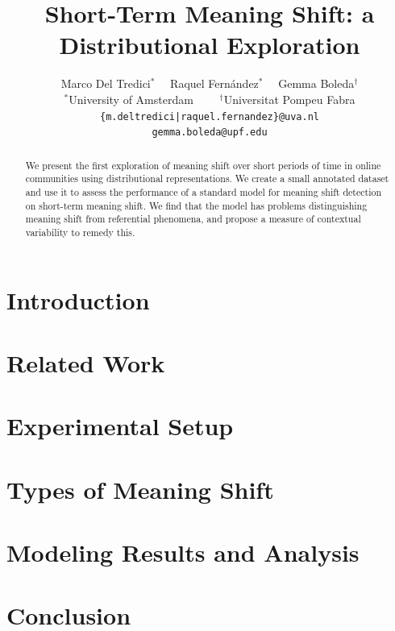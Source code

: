 \documentclass[11pt,a4paper]{article}
\title{Short-Term Meaning Shift: a Distributional Exploration}
\author{Marco Del Tredici$^*$ \ \ Raquel Fern\'andez$^*$ \ \  Gemma Boleda$^\dagger$\\
$^*$University of Amsterdam \ \ \ \ $^\dagger$Universitat Pompeu Fabra\\
  {\tt \{m.deltredici|raquel.fernandez\}@uva.nl}\\  
  {\tt gemma.boleda@upf.edu}
}
\date{}
\begin{document}
\maketitle
\begin{abstract}
We present the first exploration of meaning shift over short periods of time in online communities using distributional representations. We create a small annotated dataset and use it to assess the performance of a standard model for meaning shift detection on short-term meaning shift. We find that the model has problems distinguishing meaning shift from referential phenomena, and propose a measure of contextual variability to remedy this.
\end{abstract}

\section{Introduction}
\label{sect:Introduction}

 
\section{Related Work}
\label{sect:Related_Work}


\section{Experimental Setup}
\label{sec:setup}


\section{Types of Meaning Shift}
\label{sec:types}


\section{Modeling Results and Analysis}
\label{sec:results}


\section{Conclusion}
\label{sect:conc}

\end{document}
